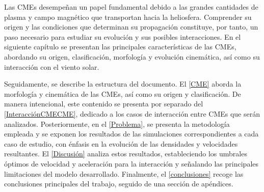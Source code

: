 Las CMEs desempeñan un papel fundamental debido a las grandes cantidades de plasma y campo magnético que transportan hacia la heliosfera. Comprender su origen y las condiciones que determinan su propagación constituye, por tanto, un paso necesario para estudiar su evolución y sus posibles interacciones. En el siguiente capítulo se presentan las principales características de las CMEs, abordando su origen, clasificación, morfología y evolución cinemática, así como su interacción con el viento solar.

Seguidamente, se describe la estructura del documento. El \autoref{CME} aborda la morfología y cinemática de las CMEs, así como su origen y clasificación. De manera intencional, este contenido se presenta por separado del \autoref{InteracciónCMECME}, dedicado a los casos de interacción entre CMEs que serán analizados. Posteriormente, en el \autoref{Problema}, se presenta la metodología empleada y se exponen los resultados de las simulaciones correspondientes a cada caso de estudio, con énfasis en la evolución de las densidades y velocidades resultantes. El \autoref{Discusión} analiza estos resultados, estableciendo los umbrales óptimos de velocidad y aceleración para la interacción y señalando las principales limitaciones del modelo desarrollado. Finalmente, el \autoref{conclusiones} recoge las conclusiones principales del trabajo, seguido de una sección de apéndices.